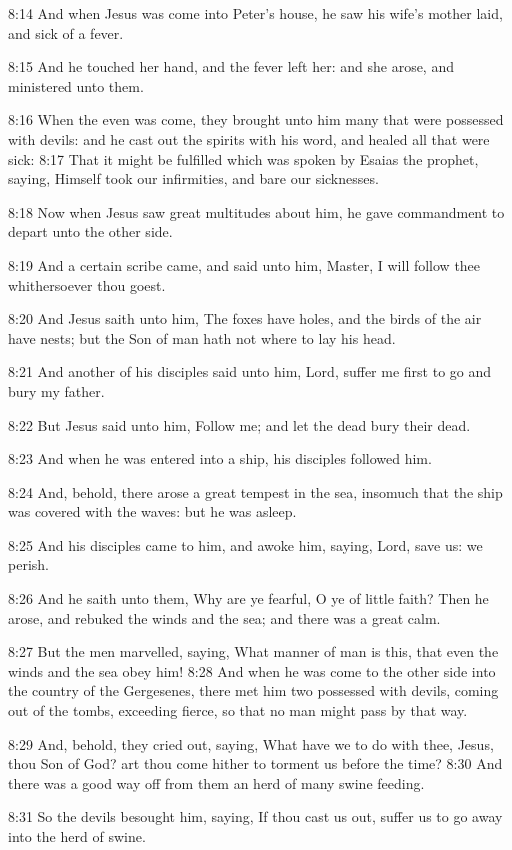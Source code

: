 8:14 And when Jesus was come into Peter's house, he saw his wife's
mother laid, and sick of a fever.

8:15 And he touched her hand, and the fever left her: and she arose,
and ministered unto them.

8:16 When the even was come, they brought unto him many that were
possessed with devils: and he cast out the spirits with his word, and
healed all that were sick: 8:17 That it might be fulfilled which was
spoken by Esaias the prophet, saying, Himself took our infirmities,
and bare our sicknesses.

8:18 Now when Jesus saw great multitudes about him, he gave
commandment to depart unto the other side.

8:19 And a certain scribe came, and said unto him, Master, I will
follow thee whithersoever thou goest.

8:20 And Jesus saith unto him, The foxes have holes, and the birds of
the air have nests; but the Son of man hath not where to lay his head.

8:21 And another of his disciples said unto him, Lord, suffer me first
to go and bury my father.

8:22 But Jesus said unto him, Follow me; and let the dead bury their
dead.

8:23 And when he was entered into a ship, his disciples followed him.

8:24 And, behold, there arose a great tempest in the sea, insomuch
that the ship was covered with the waves: but he was asleep.

8:25 And his disciples came to him, and awoke him, saying, Lord, save
us: we perish.

8:26 And he saith unto them, Why are ye fearful, O ye of little faith?
Then he arose, and rebuked the winds and the sea; and there was a
great calm.

8:27 But the men marvelled, saying, What manner of man is this, that
even the winds and the sea obey him!  8:28 And when he was come to the
other side into the country of the Gergesenes, there met him two
possessed with devils, coming out of the tombs, exceeding fierce, so
that no man might pass by that way.

8:29 And, behold, they cried out, saying, What have we to do with
thee, Jesus, thou Son of God? art thou come hither to torment us
before the time?  8:30 And there was a good way off from them an herd
of many swine feeding.

8:31 So the devils besought him, saying, If thou cast us out, suffer
us to go away into the herd of swine.

